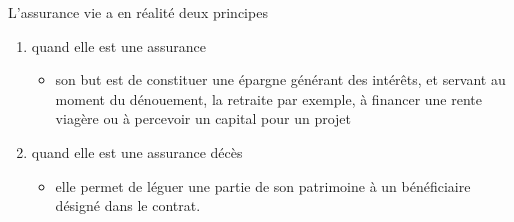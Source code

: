 \documentclass{beamer}
\begin{document}
\begin{frame}

\begin{important}
L'assurance vie a en réalité deux principes
	\begin{enumerate}
		\item quand elle est une assurance
		      \begin{itemize}
		      	\item son but est de constituer une épargne générant des intérêts, et servant au moment du dénouement, la retraite par exemple, à financer une rente viagère ou à percevoir un capital pour un projet
		      \end{itemize}
		\item quand elle est une assurance décès
		      \begin{itemize}
		      	\item elle permet de léguer une partie de son patrimoine à un bénéficiaire désigné dans le contrat.   	      
		      \end{itemize}				      		
	\end{enumerate}
\end{important}	 

\end{frame}
\end{document}
